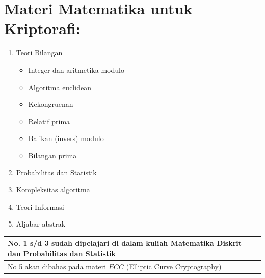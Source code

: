 \documentclass{article}
\begin{document}

\section*{Materi Matematika untuk Kriptorafi:}

\begin{enumerate}
    \item Teori Bilangan
    \begin{itemize}
        \item Integer dan aritmetika modulo
        \item Algoritma euclidean
        \item Kekongruenan
        \item Relatif prima
        \item Balikan (invers) modulo
        \item Bilangan prima
    \end{itemize}
    \item Probabilitas dan Statistik
    \item Kompleksitas algoritma
    \item Teori Informasi
    \item Aljabar abstrak
\end{enumerate}

\vspace{10mm}

\begin{tabular}{|p{9cm}|}
\hline
No. 1 s/d 3 sudah dipelajari di dalam kuliah Matematika Diskrit dan Probabilitas dan Statistik \\
\hline
No 5 akan dibahas pada materi $ECC$ (Elliptic Curve Cryptography) \\
\hline
\end{tabular}
\end{document}

